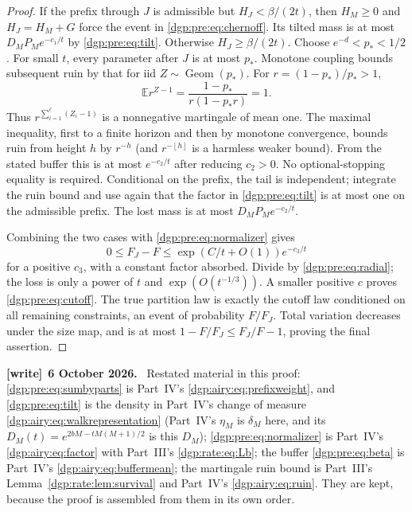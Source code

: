 \documentclass[11pt,letterpaper]{article}
\numberwithin{equation}{section}
\theoremstyle{remark}\newtheorem{remark}[theorem]{Remark}
\newcommand{\EE}{\mathbb E}
\newcommand{\floor}[1]{\left\lfloor #1\right\rfloor}
\newenvironment{writenote}[1][]{\par\smallskip\begingroup\small
 \noindent\textbf{[write]}\if\relax\detokenize{#1}\relax\else~\textbf{#1.}\fi\ }%
 {\par\endgroup\smallskip}
\begin{document}
\begin{proof}
If the prefix through $J$ is admissible but $H_J<\beta/(2t)$, then
$H_M\geq0$ and $H_J=H_M+G$ force the event in \eqref{dgp:pre:eq:chernoff}.
Its tilted mass is at most $D_MP_Me^{-c_1/t}$ by \eqref{dgp:pre:eq:tilt}.
Otherwise $H_J\geq\beta/(2t)$. Choose
$e^{-d}<p_*<1/2$. For small $t$, every parameter after $J$ is at most
$p_*$. Monotone coupling bounds subsequent ruin by that for iid
$Z\sim\operatorname{Geom}(p_*)$. For $r=(1-p_*)/p_*>1$,
\[
 \EE r^{Z-1}=\frac{1-p_*}{r(1-p_*r)}=1.
\]
Thus $r^{\sum_{i=1}^\ell(Z_i-1)}$ is a nonnegative martingale of mean
one. The maximal inequality, first to a finite horizon and then by
monotone convergence, bounds ruin from height $h$ by $r^{-h}$
(and $r^{-\floor h}$ is a harmless weaker bound). From the stated
buffer this is at most $e^{-c_2/t}$ after reducing $c_2>0$.
No optional-stopping equality is required.
Conditional on the prefix, the tail is independent; integrate the
ruin bound and use again that the factor in \eqref{dgp:pre:eq:tilt} is at most
one on the admissible prefix. The lost mass is at most
$D_MP_Me^{-c_2/t}$.

Combining the two cases with \eqref{dgp:pre:eq:normalizer} gives
\[
 0\leq F_J-F\leq \exp(C/t+O(1))e^{-c_3/t}
\]
for a positive $c_3$, with a constant factor absorbed. Divide by
\eqref{dgp:pre:eq:radial}; the loss is only a power of $t$ and
$\exp(O(t^{-1/3}))$. A smaller positive $c$ proves \eqref{dgp:pre:eq:cutoff}.
The true partition law is exactly the cutoff law conditioned on all
remaining constraints, an event of probability $F/F_J$.
Total variation decreases under the size map, and is at most
$1-F/F_J\leq F_J/F-1$, proving the final assertion.
\end{proof}
\begin{writenote}[6 October 2026]
Restated material in this proof: \eqref{dgp:pre:eq:sumbyparts} is Part~IV's \eqref{dgp:airy:eq:prefixweight}, and \eqref{dgp:pre:eq:tilt} is the density in Part~IV's change of measure \eqref{dgp:airy:eq:walkrepresentation} (Part~IV's $\eta_M$ is $\delta_M$ here, and its $D_M(t)=e^{2bM-tM(M+1)/2}$ is this $D_M$); \eqref{dgp:pre:eq:normalizer} is Part~IV's \eqref{dgp:airy:eq:factor} with Part~III's \eqref{dgp:rate:eq:Lb}; the buffer \eqref{dgp:pre:eq:beta} is Part~IV's \eqref{dgp:airy:eq:buffermean}; the martingale ruin bound is Part~III's Lemma~\ref{dgp:rate:lem:survival} and Part~IV's \eqref{dgp:airy:eq:ruin}. They are kept, because the proof is assembled from them in its own order.
\end{writenote}
\end{document}
